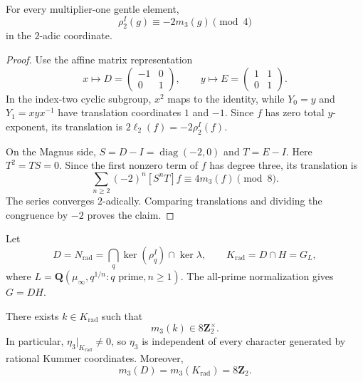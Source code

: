 \begin{lemma}
\label{lem:rho2-cubic-modfour}
For every multiplier-one gentle element,
\[
 \rho_2^I(g)\equiv-2m_3(g)\pmod4
\]
in the $2$-adic coordinate.
\end{lemma}

\begin{proof}
Use the affine matrix representation
\[
 x\longmapsto D=\begin{pmatrix}-1&0\\0&1\end{pmatrix},\qquad
 y\longmapsto E=\begin{pmatrix}1&1\\0&1\end{pmatrix}.
\]
In the index-two cyclic subgroup, $x^2$ maps to the identity, while
$Y_0=y$ and $Y_1=xyx^{-1}$ have translation coordinates $1$ and $-1$.
Since $f$ has zero total $y$-exponent, its translation is
$2\ell_2(f)=-2\rho_2^I(f)$.

On the Magnus side, $S=D-I=\operatorname{diag}(-2,0)$ and $T=E-I$.
Here $T^2=TS=0$.  Since the first nonzero term of $f$ has degree
three, its translation is
\[
 \sum_{n\ge2}(-2)^n[S^nT]f\equiv4m_3(f)\pmod8.
\]
The series converges $2$-adically.  Comparing translations and
dividing the congruence by $-2$ proves the claim.
\end{proof}

Let
\[
 D=N_{\mathrm{rad}}=\bigcap_q\ker(\rho_q^I)\cap\ker\lambda,
 \qquad
 K_{\mathrm{rad}}=D\cap H=G_L,
\]
where $L=\mathbf Q(\mu_\infty,q^{1/n}:q\text{ prime},n\ge1)$.
The all-prime normalization gives $G=DH$.

\begin{proposition}
\label{prop:cubic-arithmetic-witness}
There exists $k\in K_{\mathrm{rad}}$ such that
\[
 m_3(k)\in8\mathbf Z_2^\times.
\]
In particular, $\eta_3|_{K_{\mathrm{rad}}}\ne0$, so $\eta_3$ is
independent of every character generated by rational Kummer coordinates.
Moreover,
\[
 m_3(D)=m_3(K_{\mathrm{rad}})=8\mathbf Z_2.
\]
\end{proposition}

